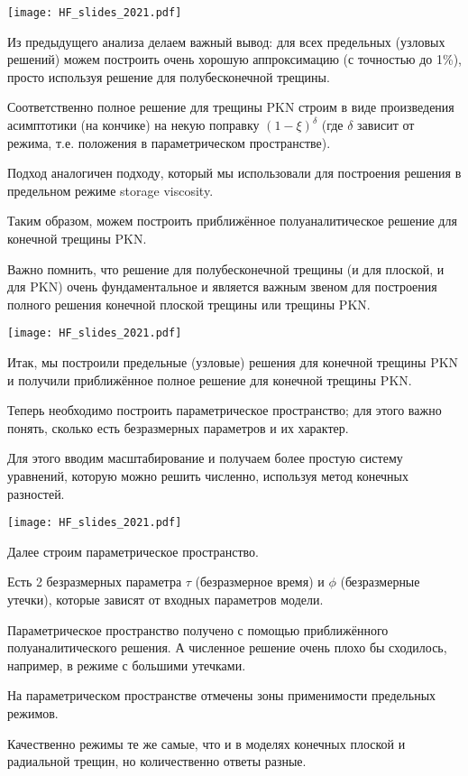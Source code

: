 \documentclass[main.tex]{subfiles}
\begin{document}
\texttt{[image: HF\_slides\_2021.pdf]}

Из предыдущего анализа делаем важный вывод: для всех предельных (узловых решений) можем построить очень хорошую аппроксимацию (с точностью до 1\%), просто используя решение для полубесконечной трещины.

Соответственно полное решение для трещины PKN строим в виде произведения асимптотики (на кончике) на некую поправку $(1-\xi)^\delta$ (где $\delta$ зависит от режима, т.е. положения в параметрическом пространстве).

Подход аналогичен подходу, который мы использовали для построения решения в предельном режиме storage viscosity.

Таким образом, можем построить приближённое полуаналитическое решение для конечной трещины PKN.

Важно помнить, что решение для полубесконечной трещины (и для плоской, и для PKN) очень фундаментальное и является важным звеном для построения полного решения конечной плоской трещины или трещины PKN.

\texttt{[image: HF\_slides\_2021.pdf]}

Итак, мы построили предельные (узловые) решения для конечной трещины PKN и получили приближённое полное решение для конечной трещины PKN.

Теперь необходимо построить параметрическое пространство;
для этого важно понять, сколько есть безразмерных параметров и их характер.

Для этого вводим масштабирование и получаем более простую систему уравнений, которую можно решить численно, используя метод конечных разностей.

\texttt{[image: HF\_slides\_2021.pdf]}

Далее строим параметрическое пространство.

Есть 2 безразмерных параметра $\tau$ (безразмерное время) и $\phi$ (безразмерные утечки), которые зависят от входных параметров модели.

Параметрическое пространство получено с помощью приближённого полуаналитического решения.
А численное решение очень плохо бы сходилось, например, в режиме с большими утечками.

На параметрическом пространстве отмечены зоны применимости предельных режимов.

Качественно режимы те же самые, что и в моделях конечных плоской и радиальной трещин, но количественно ответы разные.
\\
\end{document}

